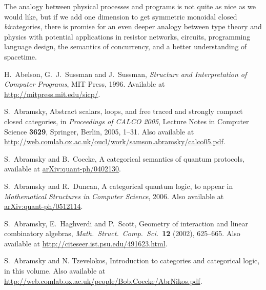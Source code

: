 \documentclass[12pt,twoside,openright]{report}
\begin{document}
The analogy between physical processes and programs is not quite as nice as we would like, but if we add one dimension to get symmetric monoidal closed {\em bi}categories, there is promise for an even deeper analogy between type theory and physics with potential applications in resistor networks, circuits, programming language design, the semantics of concurrency, and a better understanding of spacetime.

\begin{thebibliography}{99}

\newcommand{\quantph}[1]{\href{http://arxiv.org/abs/quant-ph/#1}{{ arXiv:quant-ph/#1}}}
\newcommand{\hepth}[1]{\href{http://arxiv.org/abs/hep-th/#1}{{ arXiv:hep-th/#1}}}
\newcommand{\grqc}[1]{\href{http://arxiv.org/abs/gr-qc/#1}{{ arXiv:gr-qc/#1}}}
\newcommand{\qalg}[1]{\href{http://arxiv.org/abs/q-alg/#1}{{ arXiv:q-alg/#1}}}
\newcommand{\mathph}[1]{\href{http://arxiv.org/abs/math-ph/#1}{{ arXiv:math-ph/#1}}}
\newcommand{\Math}[1]{\href{http://arxiv.org/abs/math/#1}{{ arXiv:math/#1}}}
\newcommand{\arxiv}[1]{\href{http://arxiv.org/abs/#1}{{ arXiv:#1}}}

 H.\ Abelson, G.\ J.\ Sussman and J.\
Sussman, {\sl Structure and Interpretation of Computer Programs}, MIT Press, 1996.  Available at \href{http://mitpress.mit.edu/sicp/}{{ http://mitpress.mit.edu/sicp/}}.

S.\ Abramsky, Abstract scalars, loops, and free traced and strongly compact closed categories, in {\sl Proceedings of CALCO 2005}, Lecture Notes in Computer Science {\bf 3629}, Springer, Berlin,
2005, 1--31. Also available at \hfill \break 
\href{http://web.comlab.ox.ac.uk/oucl/work/samson.abramsky/calco05.pdf}{ http://web.comlab.ox.ac.uk/oucl/work/samson.abramsky/calco05.pdf}.

 S.\ Abramsky and B.\ Coecke, A categorical semantics of quantum protocols, available at \quantph{0402130}.

S.\ Abramsky and R.\ Duncan, A categorical quantum logic, to appear in {\sl Mathematical Structures in Computer Science}, 2006. Also available at \quantph{0512114}.

 S.\ Abramsky, E.\ Haghverdi and P.\ Scott, Geometry of interaction and linear combinatory algebras, 
{\sl Math.\ Struct.\ Comp.\ Sci.\ }{\bf 12} (2002), 625--665.  Also available at \hfill \break
\href{http://citeseer.ist.psu.edu/491623.html}{ http://citeseer.ist.psu.edu/491623.html}.

 S.\ Abramsky and N. Tzevelokos, Introduction to categories and categorical logic, in this volume.  Also available at
\href{http://web.comlab.ox.ac.uk/people/Bob.Coecke/AbrNikos.pdf}{ http://web.comlab.ox.ac.uk/people/Bob.Coecke/AbrNikos.pdf}.


\end{thebibliography}
\end{document}
